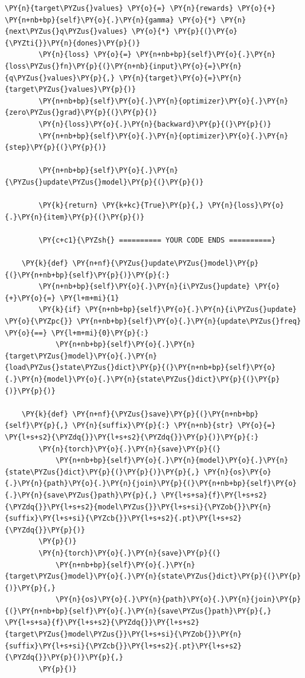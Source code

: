 \documentclass{article}
\begin{document}
\begin{Verbatim}[commandchars=\\\{\}]
        \PY{n}{target\PYZus{}values} \PY{o}{=} \PY{n}{rewards} \PY{o}{+} \PY{n+nb+bp}{self}\PY{o}{.}\PY{n}{gamma} \PY{o}{*} \PY{n}{next\PYZus{}q\PYZus{}values} \PY{o}{*} \PY{p}{(}\PY{o}{\PYZti{}}\PY{n}{dones}\PY{p}{)}
        \PY{n}{loss} \PY{o}{=} \PY{n+nb+bp}{self}\PY{o}{.}\PY{n}{loss\PYZus{}fn}\PY{p}{(}\PY{n+nb}{input}\PY{o}{=}\PY{n}{q\PYZus{}values}\PY{p}{,} \PY{n}{target}\PY{o}{=}\PY{n}{target\PYZus{}values}\PY{p}{)}
        \PY{n+nb+bp}{self}\PY{o}{.}\PY{n}{optimizer}\PY{o}{.}\PY{n}{zero\PYZus{}grad}\PY{p}{(}\PY{p}{)}
        \PY{n}{loss}\PY{o}{.}\PY{n}{backward}\PY{p}{(}\PY{p}{)}
        \PY{n+nb+bp}{self}\PY{o}{.}\PY{n}{optimizer}\PY{o}{.}\PY{n}{step}\PY{p}{(}\PY{p}{)}

        \PY{n+nb+bp}{self}\PY{o}{.}\PY{n}{\PYZus{}update\PYZus{}model}\PY{p}{(}\PY{p}{)}

        \PY{k}{return} \PY{k+kc}{True}\PY{p}{,} \PY{n}{loss}\PY{o}{.}\PY{n}{item}\PY{p}{(}\PY{p}{)}

        \PY{c+c1}{\PYZsh{} ========== YOUR CODE ENDS ==========}

    \PY{k}{def} \PY{n+nf}{\PYZus{}update\PYZus{}model}\PY{p}{(}\PY{n+nb+bp}{self}\PY{p}{)}\PY{p}{:}
        \PY{n+nb+bp}{self}\PY{o}{.}\PY{n}{i\PYZus{}update} \PY{o}{+}\PY{o}{=} \PY{l+m+mi}{1}
        \PY{k}{if} \PY{n+nb+bp}{self}\PY{o}{.}\PY{n}{i\PYZus{}update} \PY{o}{\PYZpc{}} \PY{n+nb+bp}{self}\PY{o}{.}\PY{n}{update\PYZus{}freq} \PY{o}{==} \PY{l+m+mi}{0}\PY{p}{:}
            \PY{n+nb+bp}{self}\PY{o}{.}\PY{n}{target\PYZus{}model}\PY{o}{.}\PY{n}{load\PYZus{}state\PYZus{}dict}\PY{p}{(}\PY{n+nb+bp}{self}\PY{o}{.}\PY{n}{model}\PY{o}{.}\PY{n}{state\PYZus{}dict}\PY{p}{(}\PY{p}{)}\PY{p}{)}

    \PY{k}{def} \PY{n+nf}{\PYZus{}save}\PY{p}{(}\PY{n+nb+bp}{self}\PY{p}{,} \PY{n}{suffix}\PY{p}{:} \PY{n+nb}{str} \PY{o}{=} \PY{l+s+s2}{\PYZdq{}}\PY{l+s+s2}{\PYZdq{}}\PY{p}{)}\PY{p}{:}
        \PY{n}{torch}\PY{o}{.}\PY{n}{save}\PY{p}{(}
            \PY{n+nb+bp}{self}\PY{o}{.}\PY{n}{model}\PY{o}{.}\PY{n}{state\PYZus{}dict}\PY{p}{(}\PY{p}{)}\PY{p}{,} \PY{n}{os}\PY{o}{.}\PY{n}{path}\PY{o}{.}\PY{n}{join}\PY{p}{(}\PY{n+nb+bp}{self}\PY{o}{.}\PY{n}{save\PYZus{}path}\PY{p}{,} \PY{l+s+sa}{f}\PY{l+s+s2}{\PYZdq{}}\PY{l+s+s2}{model\PYZus{}}\PY{l+s+si}{\PYZob{}}\PY{n}{suffix}\PY{l+s+si}{\PYZcb{}}\PY{l+s+s2}{.pt}\PY{l+s+s2}{\PYZdq{}}\PY{p}{)}
        \PY{p}{)}
        \PY{n}{torch}\PY{o}{.}\PY{n}{save}\PY{p}{(}
            \PY{n+nb+bp}{self}\PY{o}{.}\PY{n}{target\PYZus{}model}\PY{o}{.}\PY{n}{state\PYZus{}dict}\PY{p}{(}\PY{p}{)}\PY{p}{,}
            \PY{n}{os}\PY{o}{.}\PY{n}{path}\PY{o}{.}\PY{n}{join}\PY{p}{(}\PY{n+nb+bp}{self}\PY{o}{.}\PY{n}{save\PYZus{}path}\PY{p}{,} \PY{l+s+sa}{f}\PY{l+s+s2}{\PYZdq{}}\PY{l+s+s2}{target\PYZus{}model\PYZus{}}\PY{l+s+si}{\PYZob{}}\PY{n}{suffix}\PY{l+s+si}{\PYZcb{}}\PY{l+s+s2}{.pt}\PY{l+s+s2}{\PYZdq{}}\PY{p}{)}\PY{p}{,}
        \PY{p}{)}


\end{Verbatim}
\end{document}
